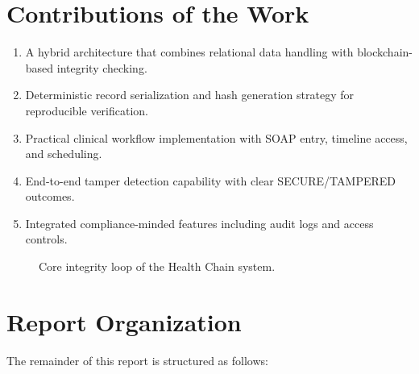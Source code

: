 \documentclass[12pt,a4paper]{report}
\begin{document}
\section{Contributions of the Work}

\begin{enumerate}
\item A hybrid architecture that combines relational data handling with blockchain-based integrity checking.
\item Deterministic record serialization and hash generation strategy for reproducible verification.
\item Practical clinical workflow implementation with SOAP entry, timeline access, and scheduling.
\item End-to-end tamper detection capability with clear SECURE/TAMPERED outcomes.
\item Integrated compliance-minded features including audit logs and access controls.
\end{enumerate}

\begin{figure}[htbp]
\centering
{}
\caption{Core integrity loop of the Health Chain system.}
\label{fig:healthchain-integrity-loop}
\end{figure}

\section{Report Organization}

The remainder of this report is structured as follows:
\end{document}
